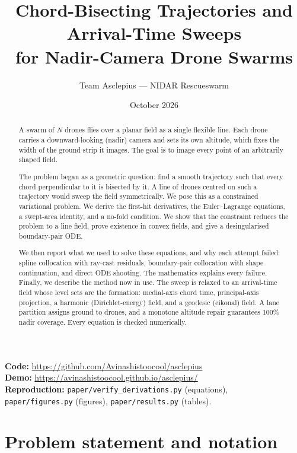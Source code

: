 \documentclass[11pt,a4paper]{article}
\title{Chord-Bisecting Trajectories and Arrival-Time Sweeps\\for Nadir-Camera Drone Swarms}
\author{Team Asclepius --- NIDAR Rescueswarm}
\date{October 2026}
\numberwithin{equation}{section}
\theoremstyle{plain}
\theoremstyle{definition}
\theoremstyle{remark}
\begin{document}
\maketitle

\begin{abstract}
A swarm of $N$ drones flies over a planar field as a single flexible line. Each drone carries a downward-looking (nadir) camera and sets its own altitude, which fixes the width of the ground strip it images. The goal is to image every point of an arbitrarily shaped field.

The problem began as a geometric question: find a smooth trajectory such that every chord perpendicular to it is bisected by it. A line of drones centred on such a trajectory would sweep the field symmetrically. We pose this as a constrained variational problem. We derive the first-hit derivatives, the Euler--Lagrange equations, a swept-area identity, and a no-fold condition. We show that the constraint reduces the problem to a line field, prove existence in convex fields, and give a desingularised boundary-pair ODE.

We then report what we used to solve these equations, and why each attempt failed: spline collocation with ray-cast residuals, boundary-pair collocation with shape continuation, and direct ODE shooting. The mathematics explains every failure. Finally, we describe the method now in use. The sweep is relaxed to an arrival-time field whose level sets are the formation: medial-axis chord time, principal-axis projection, a harmonic (Dirichlet-energy) field, and a geodesic (eikonal) field. A lane partition assigns ground to drones, and a monotone altitude repair guarantees 100\% nadir coverage. Every equation is checked numerically.
\end{abstract}

\noindent\textbf{Code:} \url{https://github.com/Avinashistoocool/asclepius}\\
\textbf{Demo:} \url{https://avinashistoocool.github.io/asclepius/}\\
\textbf{Reproduction:} \texttt{paper/verify\_derivations.py} (equations),\\
\texttt{paper/figures.py} (figures), \texttt{paper/results.py} (tables).

\tableofcontents
\newpage

\section{Problem statement and notation}
\end{document}
